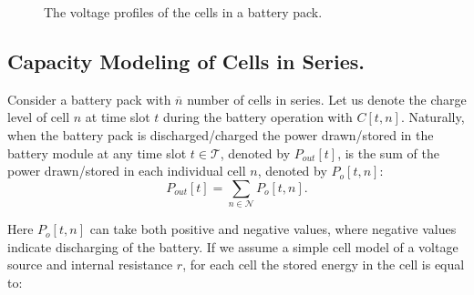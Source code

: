 \documentclass[10pt,twocolumn]{IEEEtran}
\begin{document}
\begin{figure}[t]
\centering
\vspace{-0.2cm}
{} \vspace{-0.1cm}
\caption{The voltage profiles of the cells in a battery pack.}
\vspace{-0.3cm}
\label{fig:packoperation}
\end{figure}

\subsection{Capacity Modeling of Cells  in Series.}
Consider a battery pack with $\overline{n}$  number of cells in series. 
Let us denote the charge level of cell $n$ at time slot $t$  during the battery operation with $C[t,n]$.
Naturally, when the battery pack is discharged/charged  the power drawn/stored in the battery module at any time slot $t \in \mathcal{T}$, denoted by $P_{out}[t]$,  is the sum of the power drawn/stored in each individual cell $n$, denoted by $P_{o}[t,n]$:
\begin{equation}
P_{out}[t]=\sum_{n \in \mathcal{N}}  P_{o}[t,n].%
\label{Pmodule}
\end{equation}

\noindent Here $P_{o}[t,n]$ can take both positive and negative values, where negative values indicate discharging of the battery.
If we assume a simple cell model of a voltage source and internal resistance $r$, for each cell the stored energy in the cell is equal to:
\end{document}
